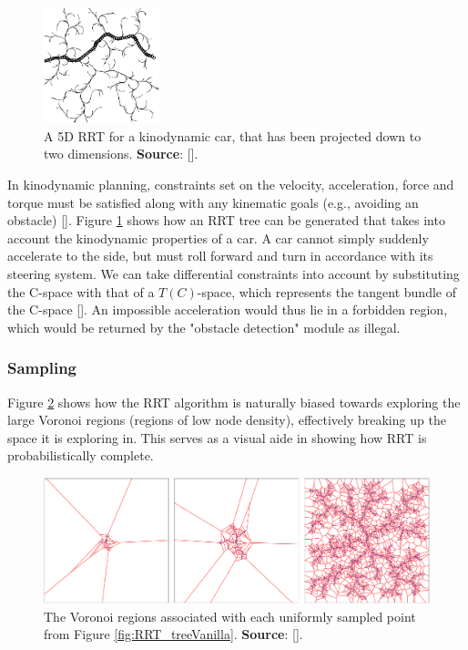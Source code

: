 \begin{figure}[h]
	\centering
	\includegraphics[width=0.3\textwidth]{import/RRT_kinodcar.png}
	\caption{A 5D RRT for a kinodynamic car, that has been projected down to two dimensions. \textbf{Source}: [\citeauthor{LaValle1998}].}
	\label{fig:RRT_kinod}
\end{figure}

In kinodynamic planning, constraints set on the velocity, acceleration, force and torque must be satisfied along with any kinematic goals (e.g., avoiding an obstacle) [\citeauthor{Donald1993}]. Figure \ref{fig:RRT_kinod} shows how an \gls{RRT} tree can be generated that takes into account the kinodynamic properties of a car. A car cannot simply suddenly accelerate to the side, but must roll forward and turn in accordance with its steering system. We can take differential constraints into account by substituting the C-space  with that of a $T(C)$-space, which represents the tangent bundle of the C-space [\citeauthor{LaValle1998}]. An impossible acceleration would thus lie in a forbidden region, which would be returned by the "obstacle detection" module as illegal.



\subsubsection{Sampling} \label{subsec:Sampling}

Figure \ref{fig:RRT_voronoi} shows how the \gls{RRT} algorithm is naturally biased towards exploring the large Voronoi regions (regions of low node density), effectively breaking up the space it is exploring in. This serves as a visual aide in showing how \gls{RRT} is probabilistically complete.

\begin{figure}[h]
	\centering
	\includegraphics[width=1\textwidth]{import/RRT_voronoi_region.png}
	\caption{The Voronoi regions associated with each uniformly sampled point from Figure \ref{fig:RRT_treeVanilla}. \textbf{Source}: [\citeauthor{Cheng2001}].}
	\label{fig:RRT_voronoi}
\end{figure}


